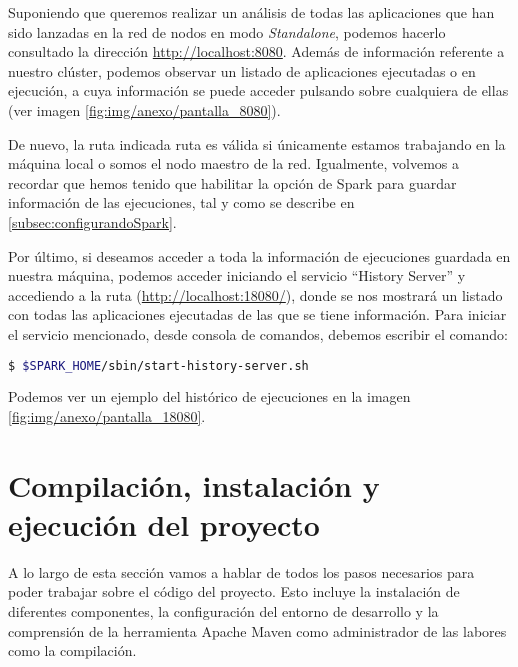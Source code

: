 
Suponiendo que queremos realizar un análisis de todas las aplicaciones que han sido lanzadas en la red de nodos en modo \textit{Standalone}, podemos hacerlo consultado la dirección \url{http://localhost:8080}. Además de información referente a nuestro clúster, podemos observar un listado de aplicaciones ejecutadas o en ejecución, a cuya información se puede acceder pulsando sobre cualquiera de ellas (ver imagen \ref{fig:img/anexo/pantalla_8080}).


De nuevo, la ruta indicada ruta es válida si únicamente estamos trabajando en la máquina local o somos el nodo maestro de la red. Igualmente, volvemos a recordar que hemos tenido que habilitar la opción de Spark para guardar información de las ejecuciones, tal y como se describe en \ref{subsec:configurandoSpark}.

Por último, si deseamos acceder a toda la información de ejecuciones guardada en nuestra máquina, podemos acceder iniciando el servicio ``History Server'' y accediendo a la ruta (\url{http://localhost:18080/}), donde se nos mostrará un listado con todas las aplicaciones ejecutadas de las que se tiene información. Para iniciar el servicio mencionado, desde consola de comandos, debemos escribir el comando:

\begin{lstlisting}[language=bash]
$ $SPARK_HOME/sbin/start-history-server.sh
\end{lstlisting}

Podemos ver un ejemplo del histórico de ejecuciones en la imagen \ref{fig:img/anexo/pantalla_18080}.




\section{Compilación, instalación y ejecución del proyecto}

A lo largo de esta sección vamos a hablar de todos los pasos necesarios para poder trabajar sobre el código del proyecto. Esto incluye la instalación de diferentes componentes, la configuración del entorno de desarrollo y la comprensión de la herramienta Apache Maven como administrador de las labores como la compilación.

